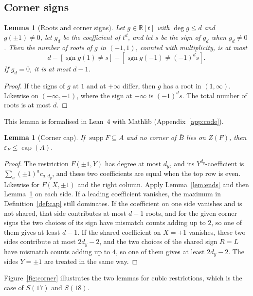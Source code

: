\documentclass[11pt]{amsart}
\newtheorem{lemma}[theorem]{Lemma}
\theoremstyle{definition}
\theoremstyle{remark}
\newcommand{\R}{\mathbb{R}}
\newcommand{\capn}{\operatorname{cap}}
\newcommand{\supp}{\operatorname{supp}}
\numberwithin{equation}{section}
\begin{document}
\subsection{Corner signs}
\begin{lemma}[Roots and corner signs]\label{lem:roots}
Let $g\in\R[t]$ with $\deg g\le d$ and $g(\pm1)\ne0$, let $g_d$ be the coefficient of $t^d$,
and let $s$ be the sign of $g_d$ when $g_d\ne0$. Then the number of roots of $g$ in $(-1,1)$,
counted with multiplicity, is at most
\[
d-[\operatorname{sgn}g(1)\ne s]-[\operatorname{sgn}g(-1)\ne(-1)^ds].
\]
If $g_d=0$, it is at most $d-1$.
\end{lemma}

\begin{proof}
If the signs of $g$ at $1$ and at $+\infty$ differ, then $g$ has a root in $(1,\infty)$.
Likewise on $(-\infty,-1)$, where the sign at $-\infty$ is $(-1)^ds$. The total number of
roots is at most $d$.
\end{proof}

This lemma is formalised in Lean~4 with Mathlib (Appendix~\ref{app:code}).

\begin{lemma}[Corner cap]\label{lem:cap}
If $\supp F\subseteq A$ and no corner of $\bar B$ lies on $Z(F)$, then
$\varepsilon_F\le\capn(A)$.
\end{lemma}

\begin{proof}
The restriction $F(\pm1,Y)$ has degree at most $d_y$, and its $Y^{d_y}$-coefficient is
$\sum_a(\pm1)^ac_{a,d_y}$, and these two coefficients are equal when the top row is even.
Likewise for $F(X,\pm1)$ and the right column. Apply Lemma~\ref{lem:ends} and then
Lemma~\ref{lem:roots} on each side. If a leading coefficient vanishes, the maximum in
Definition~\ref{def:cap} still dominates. If the coefficient on one side vanishes and is not
shared, that side contributes at most $d-1$ roots, and for the given corner signs the two
choices of its sign have mismatch counts adding up to $2$, so one of them gives at least
$d-1$. If the shared coefficient on $X=\pm1$ vanishes, these two sides contribute at most
$2d_y-2$, and the two choices of the shared sign $R=L$ have mismatch counts adding up to $4$,
so one of them gives at least $2d_y-2$. The sides $Y=\pm1$ are treated in the same way.
\end{proof}

Figure~\ref{fig:corner} illustrates the two lemmas for cubic restrictions, which is the case
of $S(17)$ and $S(18)$.
\end{document}

